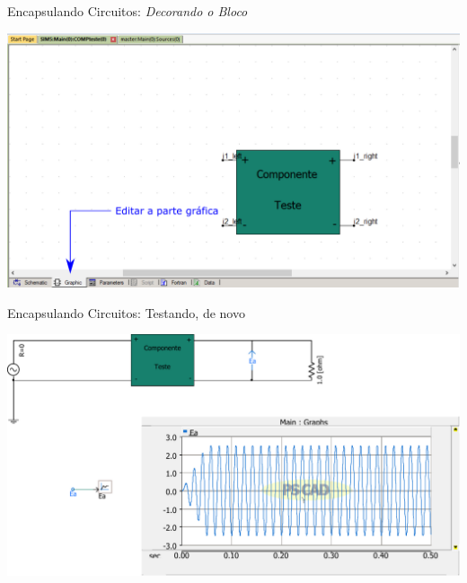 \begin{frame}{Encapsulando Circuitos: {\it Decorando o Bloco}}
\centering


\includegraphics[width=0.75\linewidth]{./figuras/Componentes/grafica}


\end{frame}






\begin{frame}{Encapsulando Circuitos: Testando, de novo}
\centering


\includegraphics[width=0.75\linewidth]{./figuras/Componentes/Testando2}


\end{frame}




